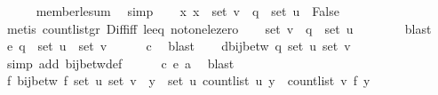 \begin{isabellebody}
\ \ \ \ \isamarkupfalse%
\ member{\isacharunderscore}{\kern0pt}le{\isacharunderscore}{\kern0pt}sum\ \isamarkupfalse%
\ simp\isanewline
\ \ \isamarkupfalse%
\ {\isachardoublequoteopen}{\isasymAnd}x{\isachardot}{\kern0pt}\ x\ {\isasymin}\ {\isacharparenleft}{\kern0pt}set\ v\ {\isacharminus}{\kern0pt}\ {\isacharparenleft}{\kern0pt}q\ {\isacharbackquote}{\kern0pt}\ set\ u{\isacharparenright}{\kern0pt}{\isacharparenright}{\kern0pt}\ {\isasymLongrightarrow}\ False{\isachardoublequoteclose}\isanewline
\ \ \ \ \isamarkupfalse%
\ {\isacharparenleft}{\kern0pt}metis\ count{\isacharunderscore}{\kern0pt}list{\isacharunderscore}{\kern0pt}gr{\isacharunderscore}{\kern0pt}{}\ Diff{\isacharunderscore}{\kern0pt}iff\ le{\isacharunderscore}{\kern0pt}{}{\isacharunderscore}{\kern0pt}eq\ not{\isacharunderscore}{\kern0pt}one{\isacharunderscore}{\kern0pt}le{\isacharunderscore}{\kern0pt}zero{\isacharparenright}{\kern0pt}\isanewline
\ \ \isamarkupfalse%
\ {\isachardoublequoteopen}set\ v\ {\isacharminus}{\kern0pt}\ {\isacharparenleft}{\kern0pt}q\ {\isacharbackquote}{\kern0pt}\ set\ u{\isacharparenright}{\kern0pt}\ {\isacharequal}{\kern0pt}\ {\isacharbraceleft}{\kern0pt}{\isacharbraceright}{\kern0pt}{\isachardoublequoteclose}\isanewline
\ \ \ \ \isamarkupfalse%
\ blast\isanewline
\isanewline
\ \ \isamarkupfalse%
\ e{\isacharcolon}{\kern0pt}\ {\isachardoublequoteopen}q\ {\isacharbackquote}{\kern0pt}\ set\ u\ {\isacharequal}{\kern0pt}\ set\ v{\isachardoublequoteclose}\isanewline
\ \ \ \ \isamarkupfalse%
\ c\ \isamarkupfalse%
\ blast\isanewline
\isanewline
\ \ \isamarkupfalse%
\ d{\isacharcolon}{\kern0pt}{\isachardoublequoteopen}bij{\isacharunderscore}{\kern0pt}betw\ q\ {\isacharparenleft}{\kern0pt}set\ u{\isacharparenright}{\kern0pt}\ {\isacharparenleft}{\kern0pt}set\ v{\isacharparenright}{\kern0pt}{\isachardoublequoteclose}\isanewline
\ \ \ \ \isamarkupfalse%
\ {\isacharparenleft}{\kern0pt}simp\ add{\isacharcolon}{\kern0pt}\ bij{\isacharunderscore}{\kern0pt}betw{\isacharunderscore}{\kern0pt}def{\isacharparenright}{\kern0pt}\isanewline
\ \ \ \ \isamarkupfalse%
\ c\ e\ a\ \isamarkupfalse%
\ blast\isanewline
\ \ \isamarkupfalse%
\ {\isachardoublequoteopen}{\isasymexists}f{\isachardot}{\kern0pt}\ bij{\isacharunderscore}{\kern0pt}betw\ f\ {\isacharparenleft}{\kern0pt}set\ u{\isacharparenright}{\kern0pt}\ {\isacharparenleft}{\kern0pt}set\ v{\isacharparenright}{\kern0pt}\ {\isasymand}\ {\isacharparenleft}{\kern0pt}{\isasymforall}y\ {\isasymin}\ set\ u{\isachardot}{\kern0pt}\ count{\isacharunderscore}{\kern0pt}list\ u\ y\ {\isacharequal}{\kern0pt}\ count{\isacharunderscore}{\kern0pt}list\ v\ {\isacharparenleft}{\kern0pt}f\ y{\isacharparenright}{\kern0pt}{\isacharparenright}{\kern0pt}{\isachardoublequoteclose}\isanewline

\end{isabellebody}
